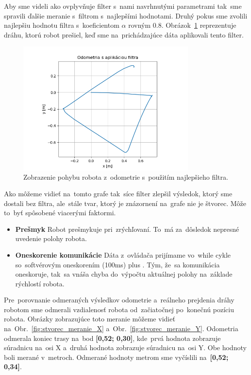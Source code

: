 Aby sme videli ako ovplyvňuje filter s~nami navrhnutými parametrami tak~sme spravili ďalšie meranie s~filtrom
s~najlepšími hodnotami. Druhý pokus sme zvolili najlepšiu hodnotu filtra s~koeficientom $\alpha$ rovným 0.8.
Obrázok~\ref{fig:stvorecSFiltrom} reprezentuje dráhu, ktorú robot prešiel, keď sme na~prichádzajúce dáta
aplikovali tento filter.

\begin{figure}[!htbp]
	\begin{center}
		\includegraphics[width=0.8\textwidth]{img/stvorec_s_filtrom_3.png}
	\end{center}
	\caption{Zobrazenie pohybu robota z~odometrie s~použitím najlepšieho filtra.}
	\label{fig:stvorecSFiltrom}
\end{figure}

Ako môžeme vidieť na~tomto grafe tak~síce filter zlepšil výsledok, ktorý sme dostali bez filtra, ale~stále tvar, ktorý
je znázornení na~grafe nie je štvorec. Môže to~byť spôsobené viacerými faktormi.

\begin{itemize}
	\item \textbf{Prešmyk} Robot prešmykuje pri~zrýchľovaní. To~má za~dôsledok nepresné uvedenie polohy robota.
	\item \textbf{Oneskorenie komunikácie} Dáta z~ovládača prijímame vo~while cykle so~softvérovým oneskorením (100ms)
		plus \cite{timovyProjekt}. Tým, že~sa komunikácia oneskoruje, tak~sa vnáša chyba do~výpočtu aktuálnej polohy
		na~základe rýchlostí robota.
\end{itemize}

Pre~porovnanie odmeraných výsledkov odometrie a~reálneho prejdenia dráhy robotom sme odmerali vzdialenosť robota
od~začiatočnej po~konečnú pozíciu robota. Obrázky zobrazujúce toto meranie môžeme vidieť
na~Obr.~\ref{fig:stvorec_meranie_X} a~Obr.~\ref{fig:stvorec_meranie_Y}.
Odometria odmerala koniec trasy na~bod \textbf{[0,52; 0,30]}, kde~prvá hodnota zobrazuje súradnicu na~osi X a~druhá hodnota
zobrazuje súradnicu na~osi Y. Obe hodnoty boli merané v~metroch. Odmerané hodnoty metrom sme vyčíslili na~\textbf{[0,52; 0,34]}.

